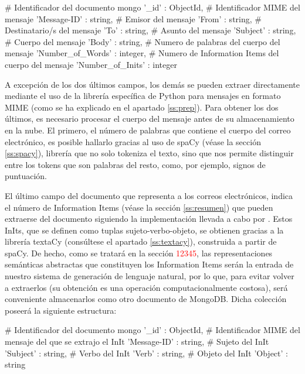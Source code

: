 \begin{python}
{
	# Identificador del documento mongo
	'_id' : ObjectId,
	# Identificador MIME del mensaje
	'Message-ID' : string,
	# Emisor del mensaje
	'From' : string,
	# Destinatario/s del mensaje
	'To' : string,
	# Asunto del mensaje
	'Subject' : string,
	# Cuerpo del mensaje
	'Body' : string,
	# Numero de palabras del cuerpo del mensaje
	'Number_of_Words' : integer,
	# Numero de Information Items del cuerpo del mensaje
	'Number_of_Inits' : integer
}
\end{python}

A excepción de los dos últimos campos, los demás se pueden extraer directamente mediante el uso de la librería específica de Python para mensajes en formato MIME (como se ha explicado en el apartado \ref{ss:prep}). Para obtener los dos últimos, es necesario procesar el cuerpo del mensaje antes de su almacenamiento en la nube. El primero, el número de palabras que contiene el cuerpo del correo electrónico, es posible hallarlo gracias al uso de spaCy (véase la sección \ref{ss:spacy}), librería que no solo tokeniza el texto, sino que nos permite distinguir entre los tokens que son palabras del resto, como, por ejemplo, signos de puntuación.

El último campo del documento que representa a los correos electrónicos, indica el número de Information Items (véase la sección \ref{ss:resumen}) que pueden extraerse del documento siguiendo la implementación llevada a cabo por \cite{genest2010text}. Estos InIts, que se definen como tuplas sujeto-verbo-objeto, se obtienen gracias a la librería textaCy (consúltese el apartado \ref{ss:textacy}), construida a partir de spaCy. De hecho, como se tratará en la sección \textcolor{red}{12345}, las representaciones semánticas abstractas que constituyen los Information Items serán la entrada de nuestro sistema de generación de lenguaje natural, por lo que, para evitar volver a extraerlos (su obtención es una operación computacionalmente costosa), será conveniente almacenarlos como otro documento de MongoDB. Dicha colección poseerá la siguiente estructura:

\begin{python}
	{
		# Identificador del documento mongo
		'_id' : ObjectId,
		# Identificador MIME del mensaje del que se extrajo el InIt
		'Message-ID' : string,
		# Sujeto del InIt
		'Subject' : string,
		# Verbo del InIt
		'Verb' : string,
		# Objeto del InIt
		'Object' : string
	}
\end{python}

